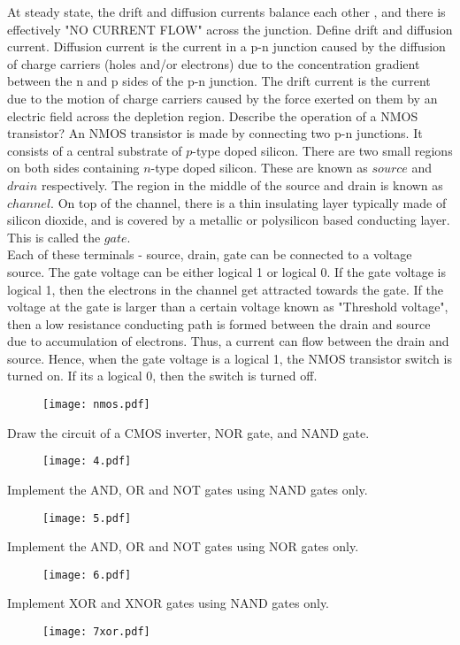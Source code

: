 \begin{ExerciseList}
At steady state, the drift and diffusion currents balance each other , and there is effectively "NO CURRENT FLOW" across the junction.
\Exercise
Define drift and diffusion current.
\Answer
Diffusion current is the current in a p-n junction caused by the diffusion of charge carriers (holes and/or electrons) due to the concentration gradient between the n and p sides of the p-n junction. The drift current is the current due to the motion of charge carriers caused by the force exerted on them by an electric field across the depletion region.
\Exercise
Describe the operation of a NMOS transistor? 
\Answer
An NMOS transistor is made by connecting two p-n junctions. It consists of a central substrate of $p$-type doped silicon. There are two small regions on both sides containing $n$-type doped silicon. These are known as $source$ and $drain$ respectively. The region in the middle of the source and drain is known as $channel$. On top of the channel, there is a thin insulating layer typically made of silicon dioxide, and is covered by a metallic or polysilicon based conducting layer. This is called the $gate$.\\
Each of these terminals - source, drain, gate can be connected to a voltage source. The gate voltage can be either logical 1 or logical 0. If the gate voltage is logical 1, then the electrons in the channel get attracted towards the gate. If the voltage at the gate is larger than a certain voltage known as "Threshold voltage", then a low resistance conducting path is formed between the drain and source due to accumulation of electrons. Thus, a current can flow between the drain and source. Hence, when the gate voltage is a logical 1, the NMOS transistor switch is turned on. If its a logical 0, then the switch is turned off. 
\begin{figure}[H]
  \centering
  \texttt{[image: nmos.pdf]}
\end{figure}
\Exercise
Draw the circuit of a CMOS inverter, NOR gate, and NAND gate.
\begin{figure}[H]
  \centering
  \texttt{[image: 4.pdf]}
\end{figure}
\Exercise
Implement the AND, OR and NOT gates using NAND gates only.
\begin{figure}[H]
  \centering
  \texttt{[image: 5.pdf]}
\end{figure}
\Exercise
Implement the AND, OR and NOT gates using NOR gates only.
\begin{figure}[H]
  \centering
  \texttt{[image: 6.pdf]}
\end{figure}
\Exercise
Implement XOR and XNOR gates using NAND gates only.
\begin{figure} [H]
  \texttt{[image: 7xor.pdf]}
\end{figure}


\end{ExerciseList}
